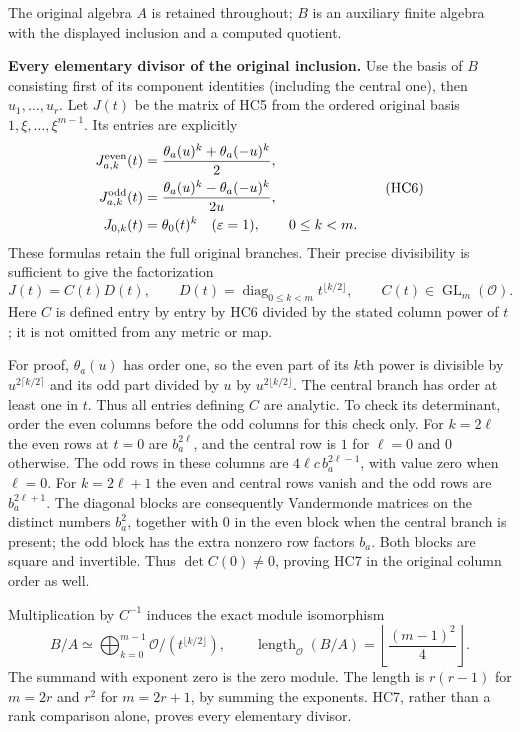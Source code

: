 The original algebra $A$ is retained throughout; $B$ is an auxiliary
finite algebra with the displayed inclusion and a computed quotient.

\HC\textbf{Every elementary divisor of the original inclusion.}
Use the basis of $B$ consisting first of its component identities
(including the central one), then $u_1,\ldots,u_r$. Let $J(t)$
be the matrix of HC5 from the ordered original basis
$1,\xi,\ldots,\xi^{m-1}$. Its entries are explicitly
\[
 \begin{split}
 J_{a,k}^{\rm even}(t)
  &=\frac{\theta_a(u)^k+\theta_a(-u)^k}{2},\\
 J_{a,k}^{\rm odd}(t)
  &=\frac{\theta_a(u)^k-\theta_a(-u)^k}{2u},\\
 J_{0,k}(t)&=\theta_0(t)^k\quad(\varepsilon=1),
       \qquad 0\le k<m.
 \end{split}
 \tag{HC6}
\]
These formulas retain the full original branches. Their precise
divisibility is sufficient to give the factorization
\[
 J(t)=C(t)D(t),\qquad
 D(t)=\operatorname{diag}_{0\le k<m}t^{\lfloor k/2\rfloor},
 \qquad C(t)\in\operatorname{GL}_m(\mathcal O).
 \tag{HC7}
\]
Here $C$ is defined entry by entry by HC6 divided by the stated
column power of $t$; it is not omitted from any metric or map.

For proof, $\theta_a(u)$ has order one, so the even part of its
$k$th power is divisible by $u^{2\lceil k/2\rceil}$ and its odd
part divided by $u$ by $u^{2\lfloor k/2\rfloor}$. The central
branch has order at least one in $t$. Thus all entries defining
$C$ are analytic. To check its determinant, order the even columns
before the odd columns for this check only. For $k=2\ell$ the even
rows at $t=0$ are $b_a^{2\ell}$, and the central row is $1$ for
$\ell=0$ and $0$ otherwise. The odd rows in these columns are
$4\ell c\,b_a^{2\ell-1}$, with value zero when $\ell=0$.
For $k=2\ell+1$ the even and central rows vanish and the odd
rows are $b_a^{2\ell+1}$. The diagonal blocks are consequently
Vandermonde matrices on the distinct numbers $b_a^2$, together
with $0$ in the even block when the central branch is present;
the odd block has the extra nonzero row factors $b_a$.
Both blocks are square and invertible. Thus $\det C(0)\ne0$,
proving HC7 in the original column order as well.

Multiplication by $C^{-1}$ induces the exact module isomorphism
\[
 \boxed{B/A\simeq
   \bigoplus_{k=0}^{m-1}\mathcal O/(t^{\lfloor k/2\rfloor}),
 \qquad
 \operatorname{length}_{\mathcal O}(B/A)
       =\left\lfloor\frac{(m-1)^2}{4}\right\rfloor.}
 \tag{HC8}
\]
The summand with exponent zero is the zero module. The length is
$r(r-1)$ for $m=2r$ and $r^2$ for $m=2r+1$, by summing the
exponents. HC7, rather than a rank comparison alone, proves every
elementary divisor.

